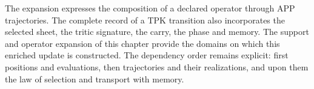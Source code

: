 The expansion expresses the composition of a declared operator through APP trajectories. The complete record of a TPK transition also incorporates the selected sheet, the tritic signature, the carry, the phase and memory. The support and operator expansion of this chapter provide the domains on which this enriched update is constructed. The dependency order remains explicit: first positions and evaluations, then trajectories and their realizations, and upon them the law of selection and transport with memory.
